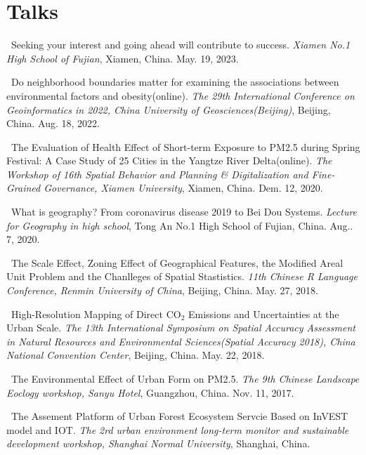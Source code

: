 \section*{Talks}
\begin{etaremune}
\item
    \Shaoqing\
    Seeking your interest and going ahead will contribute to success.
    \textit{Xiamen No.1 High School of Fujian}, Xiamen, China.
    May. 19, 2023.
    \invited
\item
    \Shaoqing\
    Do neighborhood boundaries matter for examining the associations between environmental factors and obesity(online).
    \textit{The 29th International Conference on Geoinformatics in 2022, China University of Geosciences(Beijing)}, Beijing, China.
    Aug. 18, 2022.
    \invited
\item
    \Shaoqing\
    The Evaluation of Health Effect of Short-term Exposure to PM2.5 during Spring Festival: A Case Study of 25 Cities in the Yangtze River Delta(online).
    \textit{The Workshop of 16th Spatial Behavior and Planning \& Digitalization and Fine-Grained Governance, Xiamen University}, Xiamen, China.
    Dem. 12, 2020.
    \invited
\item
    \Shaoqing\
    What is geography? From coronavirus disease 2019 to Bei Dou Systems.
    \textit{Lecture for Geography in high school}, Tong An No.1 High School of Fujian, China.
    Aug.. 7, 2020.
\item
    \Shaoqing\
    The Scale Effect, Zoning Effect of Geographical Features, the Modified Areal Unit Problem and the Chanlleges of Spatial Stastistics.
    \textit{11th Chinese R Language Conference, Renmin University of China}, Beijing, China.
    May. 27, 2018.
\item
    \Shaoqing\
    High-Resolution Mapping of Direct CO$_2$ Emissions and Uncertainties at the Urban Scale.
    \textit{The 13th International Symposium on Spatial Accuracy Assessment in Natural Resources and Environmental Sciences(Spatial Accuracy 2018), China National Convention Center}, Beijing, China.
    May. 22, 2018.
\item
    \Shaoqing\
    The Environmental Effect of Urban Form on PM2.5. 
    \textit{The 9th Chinese Landscape Eoclogy workshop, Sanyu Hotel}, Guangzhou, China.
    Nov. 11, 2017.
\item
    \Shaoqing\
    The Assement Platform of Urban Forest Ecosystem Servcie Based on InVEST model and IOT.
    \textit{The 2rd urban environment long-term monitor and sustainable development workshop, Shanghai Normal University}, Shanghai, China.

\end{etaremune}
